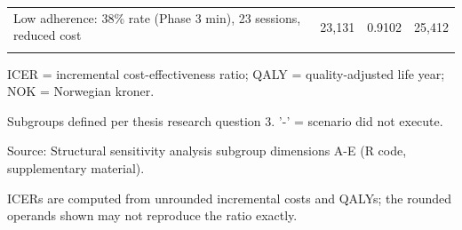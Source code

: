 \begin{table}[H]
{\begin{threeparttable}
\begin{tabular}[t]{lrrr}
\textcolor[HTML]{2D3748}{Low adherence: 38\% rate (Phase 3 min), 23 sessions, reduced cost} & \textcolor[HTML]{2D3748}{23,131} & \textcolor[HTML]{2D3748}{0.9102} & \textcolor[HTML]{2D3748}{25,412}\\
\cellcolor[HTML]{F7F9FC}{\textcolor[HTML]{2D3748}{England EQ-5D-5L value set: disease-free utility 0.85 (Mulder 2022 sensitivity analysis)}} & \cellcolor[HTML]{F7F9FC}{\textcolor[HTML]{2D3748}{32,764}} & \cellcolor[HTML]{F7F9FC}{\textcolor[HTML]{2D3748}{0.9460}} & \cellcolor[HTML]{F7F9FC}{\textcolor[HTML]{2D3748}{34,633}}\\
\bottomrule
\end{tabular}
\begin{tablenotes}
\item ICER = incremental cost-effectiveness ratio; QALY = quality-adjusted life year; NOK = Norwegian kroner.
\item Subgroups defined per thesis research question 3. '-' = scenario did not execute.
\item Source: Structural sensitivity analysis subgroup dimensions A-E (R code, supplementary material).
\item ICERs are computed from unrounded incremental costs and QALYs; the rounded operands shown may not reproduce the ratio exactly.
\end{tablenotes}
\end{threeparttable}
}
\end{table}
